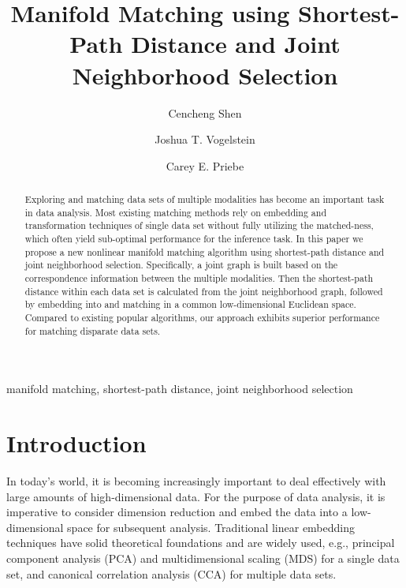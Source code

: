 \documentclass[times,twocolumn,final]{elsarticle}
\begin{document}
\begin{frontmatter}
\title{Manifold Matching using Shortest-Path Distance and Joint Neighborhood Selection}
\author[1,2]{Cencheng Shen}
\author[2,3]{Joshua T. Vogelstein}
\author[2,4]{Carey E. Priebe}

\address[1]{Department of Statistics, Temple University}
\address[2]{Center for Imaging Science, Johns Hopkins University}
\address[3]{Department of Biomedical Engineering and Institute for Computational Medicine, Johns Hopkins University}
\address[4]{Department of Applied Mathematics and Statistics, Johns Hopkins University}

\begin{abstract}
Exploring and matching data sets of multiple modalities has become an important task in data analysis. Most existing matching methods rely on embedding and transformation techniques of single data set without fully utilizing the matched-ness, which often yield sub-optimal performance for the inference task. In this paper we propose a new nonlinear manifold matching algorithm using shortest-path distance and joint neighborhood selection. Specifically, a joint graph is built based on the correspondence information between the multiple modalities. Then the shortest-path distance within each data set is calculated from the joint neighborhood graph, followed by embedding into and matching in a common low-dimensional Euclidean space. Compared to existing popular algorithms, our approach exhibits superior performance for matching disparate data sets. 
\end{abstract}
\begin{keyword}
manifold matching, shortest-path distance, joint neighborhood selection
\end{keyword}
\end{frontmatter}

\section{Introduction}
In today's world, it is becoming increasingly important to deal effectively with large amounts of high-dimensional data. For the purpose of data analysis, it is imperative to consider dimension reduction and embed the data into a low-dimensional space for subsequent analysis. Traditional linear embedding techniques have solid theoretical foundations and are widely used, e.g., principal component analysis (PCA) \citep{JolliffePCABook, BishopTipping1999} and multidimensional scaling (MDS) \citep{TorgersonBook, BorgBook, CoxBook} for a single data set, and canonical correlation analysis (CCA) \citep{Hotelling1936, BachJordan2005} for multiple data sets. 
\end{document}
